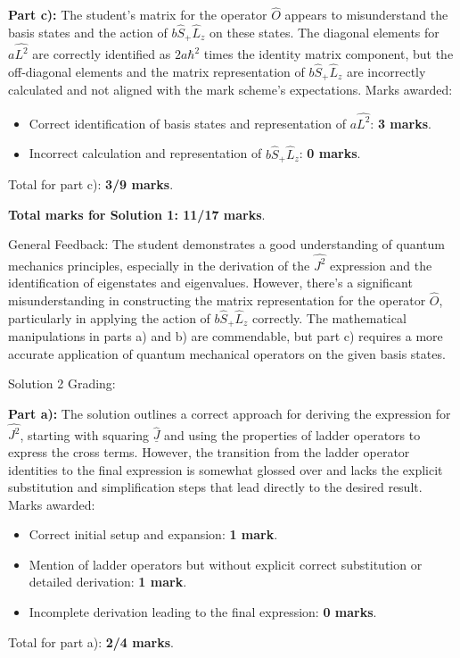 \documentclass[a4paper,11pt]{article}
\begin{document}
\textbf{Part c):} The student's matrix for the operator \(\hat{O}\) appears to misunderstand the basis states and the action of \(b\hat{S}_{+}\hat{L}_{z}\) on these states. The diagonal elements for \(a\hat{L^{2}}\) are correctly identified as \(2a\hbar^2\) times the identity matrix component, but the off-diagonal elements and the matrix representation of \(b\hat{S}_{+}\hat{L}_{z}\) are incorrectly calculated and not aligned with the mark scheme's expectations. Marks awarded:
\begin{itemize}
    \item Correct identification of basis states and representation of \(a\hat{L^{2}}\): \textbf{3 marks}.
    \item Incorrect calculation and representation of \(b\hat{S}_{+}\hat{L}_{z}\): \textbf{0 marks}.
\end{itemize}
Total for part c): \textbf{3/9 marks}.

\textbf{Total marks for Solution 1: 11/17 marks}.

General Feedback: The student demonstrates a good understanding of quantum mechanics principles, especially in the derivation of the \(\hat{J^{2}}\) expression and the identification of eigenstates and eigenvalues. However, there's a significant misunderstanding in constructing the matrix representation for the operator \(\hat{O}\), particularly in applying the action of \(b\hat{S}_{+}\hat{L}_{z}\) correctly. The mathematical manipulations in parts a) and b) are commendable, but part c) requires a more accurate application of quantum mechanical operators on the given basis states.

\hrulefill

Solution 2 Grading:

\textbf{Part a):} The solution outlines a correct approach for deriving the expression for \(\hat{J^{2}}\), starting with squaring \(\hat{\underline{J}}\) and using the properties of ladder operators to express the cross terms. However, the transition from the ladder operator identities to the final expression is somewhat glossed over and lacks the explicit substitution and simplification steps that lead directly to the desired result. Marks awarded:
\begin{itemize}
    \item Correct initial setup and expansion: \textbf{1 mark}.
    \item Mention of ladder operators but without explicit correct substitution or detailed derivation: \textbf{1 mark}.
    \item Incomplete derivation leading to the final expression: \textbf{0 marks}.
\end{itemize}
Total for part a): \textbf{2/4 marks}.
\end{document}
